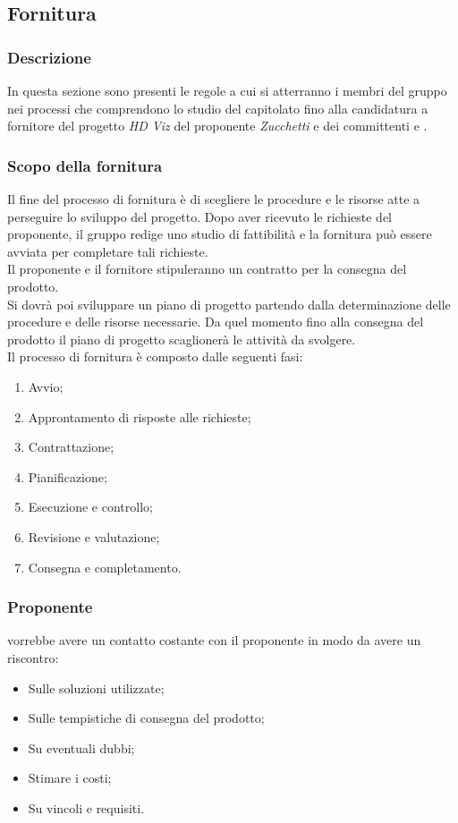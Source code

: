 \subsection{Fornitura}
\subsubsection{Descrizione}
In questa sezione sono presenti le regole a cui si atterranno i membri del gruppo \Gruppo{} nei processi che comprendono lo studio del capitolato fino alla candidatura a fornitore del progetto \textit{HD Viz} del proponente \textit{Zucchetti} e dei committenti \VT{} e \CR{}.  
\subsubsection{Scopo della fornitura}
Il fine del processo di fornitura è di scegliere le procedure e le risorse atte a perseguire lo sviluppo del progetto. Dopo aver ricevuto le richieste del proponente, il gruppo redige uno studio di fattibilità e la fornitura può essere avviata per completare tali richieste.\\
Il proponente e il fornitore stipuleranno un contratto per la consegna del prodotto.\\
Si dovrà poi sviluppare un piano di progetto partendo dalla determinazione delle procedure e delle risorse necessarie.
Da quel momento fino alla consegna del prodotto il piano di progetto scaglionerà le attività da svolgere. \\
 Il processo di fornitura è composto dalle seguenti fasi:
 \begin{enumerate}
 \item Avvio; 
\item Approntamento di risposte alle richieste;
\item Contrattazione;
\item Pianificazione;
\item Esecuzione e controllo;
\item Revisione e valutazione;
\item Consegna e completamento.
 \end{enumerate}
\subsubsection{Proponente}
\Gruppo{} vorrebbe avere un contatto costante con il proponente in modo da avere un riscontro:
\begin{itemize}
\item Sulle soluzioni utilizzate;
\item Sulle tempistiche di consegna del prodotto;
\item Su eventuali dubbi;
\item Stimare i costi;
\item Su vincoli e requisiti.
\end{itemize}
